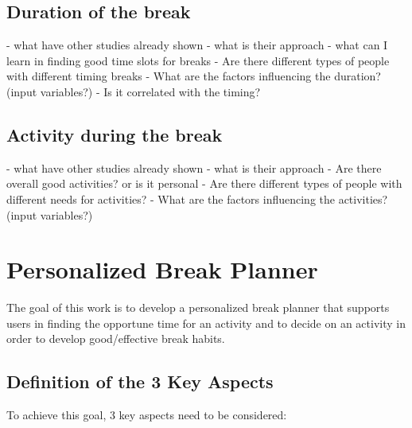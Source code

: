 \documentclass{hasel_thesis}
\begin{document}
\section{Duration of the break}
- what have other studies already shown
- what is their approach
- what can I learn in finding good time slots for breaks
- Are there different types of people with different timing breaks
- What are the factors influencing the duration? (input variables?)
- Is it correlated with the timing?

\section{Activity during the break}
- what have other studies already shown
- what is their approach
- Are there overall good activities? or is it personal
- Are there different types of people with different needs for activities?
- What are the factors influencing the activities? (input variables?)

\chapter{Personalized Break Planner}

The goal of this work is to develop a personalized break planner that supports users in finding the opportune   time for an activity and to decide on an activity in order to develop good/effective break habits. 

\section{Definition of the 3 Key Aspects}
To achieve this goal, 3 key aspects need to be considered:
\end{document}
